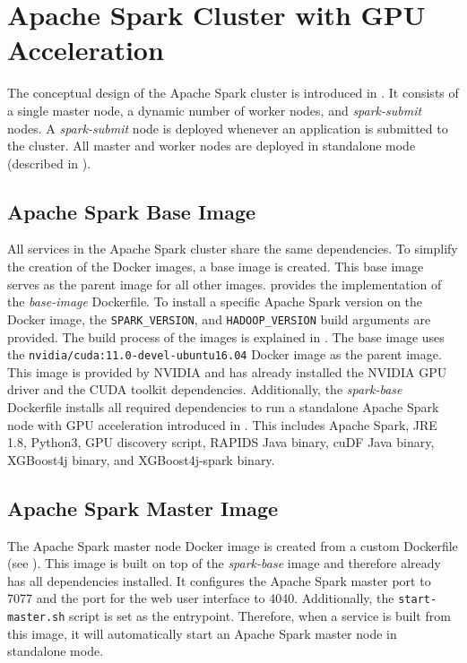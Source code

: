 \section{Apache Spark Cluster with GPU Acceleration}
\label{sec:07_spark}
The conceptual design of the Apache Spark cluster is introduced in . It consists of a single master node, a dynamic number of worker nodes, and \textit{spark-submit} nodes. A \textit{spark-submit} node is deployed whenever an application is submitted to the cluster.
All master and worker nodes are deployed in standalone mode (described in ).


\subsection{Apache Spark Base Image}
All services in the Apache Spark cluster share the same dependencies. To simplify the creation of the Docker images, a base image is created. This base image serves as the parent image for all other images.
%
 provides the implementation of the \textit{base-image} Dockerfile.
%
To install a specific Apache Spark version on the Docker image, the \texttt{SPARK\_VERSION}, and \texttt{HADOOP\_VERSION} build arguments are provided. The build process of the images is explained in .
%
The base image uses the \texttt{nvidia/cuda:11.0-devel-ubuntu16.04} Docker image as the parent image. This image is provided by NVIDIA and has already installed the NVIDIA GPU driver and the CUDA toolkit dependencies.
%
Additionally, the \textit{spark-base} Dockerfile installs all required dependencies to run a standalone Apache Spark node with GPU acceleration introduced in . This includes Apache Spark, JRE 1.8, Python3, GPU discovery script, RAPIDS Java binary, cuDF Java binary, XGBoost4j binary, and XGBoost4j-spark binary.


\subsection{Apache Spark Master Image}
The Apache Spark master node Docker image is created from a custom Dockerfile (see ).
This image is built on top of the \textit{spark-base} image and therefore already has all dependencies installed.
It configures the Apache Spark master port to 7077 and the port for the web user interface to 4040.
Additionally, the \texttt{start-master.sh} script is set as the entrypoint. Therefore, when a service is built from this image, it will automatically start an Apache Spark master node in standalone mode.


